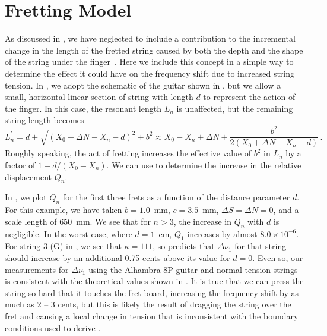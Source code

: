 %
%
%

 \section{Fretting Model\label{app:fret}}

As discussed in , we have neglected to include a contribution to the incremental change in the length of the fretted string caused by both the depth and the shape of the string under the finger~\cite{ref:byers1996cgi,ref:varieschi2010icf}. Here we include this concept in a simple way to determine the effect it could have on the frequency shift due to increased string tension. In , we adopt the schematic of the guitar shown in , but we allow a small, horizontal linear section of string with length $d$ to represent the action of the finger. In this case, the resonant length $L_n$ is unaffected, but the remaining string length becomes
 \begin{equation}
L^\prime_n = d + \sqrt{\left(X_0 + \Delta N - X_n - d\right)^2 + b^2} \approx X_0 - X_n + \Delta N + \frac{b^2}{2 \left(X_0 + \Delta N - X_n - d\right)}\, .
 \end{equation}
Roughly speaking, the act of fretting increases the effective value of $b^2$ in $L^\prime_n$ by a factor of $1 + d / (X_0 - X_n)$. We can use  to determine the increase in the relative displacement $Q_n$.

In , we plot $Q_n$ for the first three frets as a function of the distance parameter $d$. For this example, we have taken $b = 1.0$~mm, $c = 3.5$~mm, $\Delta S = \Delta N = 0$, and a scale length of 650~mm. We see that for $n > 3$, the increase in $Q_n$ with $d$ is negligible. In the worst case, where $d = 1$~cm, $Q_1$ increases by almost $8.0 \times 10^{-6}$. For string 3 (G) in , we see that $\kappa = 111$, so  predicts that $\Delta \nu_1$ for that string should increase by an additional 0.75 cents above its value for $d = 0$. Even so, our measurements for $\Delta \nu_1$ using the Alhambra 8P guitar and normal tension strings is consistent with the theoretical values shown in . It is true that we can press the string so hard that it touches the fret board, increasing the frequency shift by as much as 2 -- 3 cents, but this is likely the result of dragging the string over the fret and causing a local change in tension that is inconsistent with the boundary conditions used to derive .

